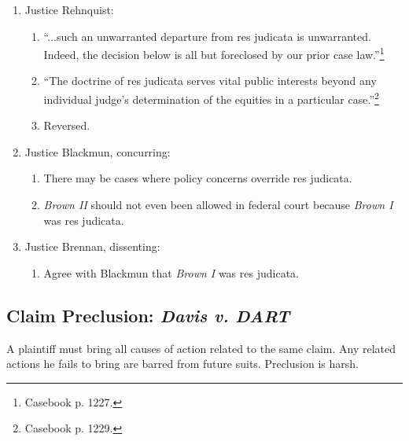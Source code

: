 \begin{enumerate}
{    \enquote{public policy} and \enquote{simple justice.}}\footnote{Casebook 
    p. 1226.}
    \item Justice Rehnquist:
    \begin{enumerate}
        \item ``...such an unwarranted departure from res judicata is 
        unwarranted. Indeed, the decision below is all but foreclosed by our 
        prior case law.''\footnote{Casebook p. 1227.}
        \item ``The doctrine of res judicata serves vital public interests 
        beyond any individual judge's determination of the equities in a 
        particular case.''\footnote{Casebook p. 1229.}
        \item Reversed.
    \end{enumerate}
    \item Justice Blackmun, concurring:
    \begin{enumerate}
        \item There may be cases where policy concerns override res judicata.
        \item \emph{Brown II} should not even been allowed in federal court 
        because \emph{Brown I} was res judicata.
    \end{enumerate}
    \item Justice Brennan, dissenting:
    \begin{enumerate}
        \item Agree with Blackmun that \emph{Brown I} was res judicata.
    \end{enumerate}
\end{enumerate}

\subsection{Claim Preclusion: \emph{Davis v. DART}}

A plaintiff must bring all causes of action related to the same claim. Any 
related actions he fails to bring are barred from future suits. Preclusion is 
harsh.

